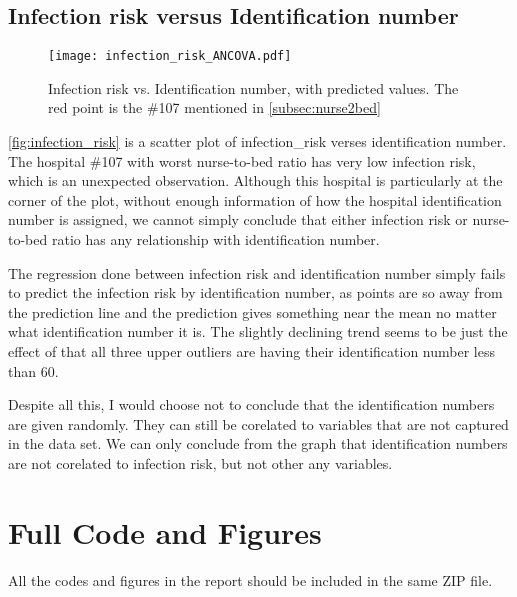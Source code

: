 \documentclass[11pt]{article}
\begin{document}
\subsection{Infection risk versus Identification number}

\begin{figure}
  \centering
  \texttt{[image: infection\_risk\_ANCOVA.pdf]}
  \caption{Infection risk vs. Identification number, with predicted values. The red
    point is the \#107 mentioned in \autoref{subsec:nurse2bed} }
  \label{fig:infection_risk}
\end{figure}

\autoref{fig:infection_risk} is a scatter plot of infection\_risk verses identification number.
The hospital \#107 with worst nurse-to-bed ratio has very low infection risk, which is an
unexpected observation. Although this hospital is particularly at the corner of the
plot, without enough information of how the hospital identification number is assigned,
we cannot simply conclude that either infection risk or nurse-to-bed ratio has any relationship
with identification number.

The regression done between infection risk and identification number simply fails to predict
the infection risk by identification number, as points are so away from the prediction line
and the prediction gives something near the mean no matter what identification number it is.
The slightly declining trend seems to be just the effect of that all three upper outliers
are having their identification number less than 60.

Despite all this, I would choose not to conclude that the identification numbers are given
randomly. They can still be corelated to variables that are not captured in the data set.
We can only conclude from the graph that identification numbers are not corelated to
infection risk, but not other any variables.

\section{Full Code and Figures}
All the codes and figures in the report should be included in the same ZIP file.
\end{document}
